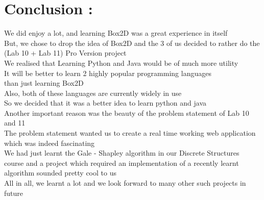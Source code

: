 \documentclass{article}
\begin{document}
\section*{Conclusion : }
\hspace*{5 mm}We did enjoy a lot, and learning Box2D was a great experience in itself \\
\hspace*{5 mm}But, we chose to drop the idea of Box2D and the 3 of us decided to rather do the \\
\hspace*{5 mm}(Lab 10 + Lab 11) Pro Version project \\
\hspace*{5 mm}We realised that Learning Python and Java would be of much more utility \\
\hspace*{5 mm}It will be better to learn 2 highly popular programming languages \\
\hspace*{5 mm}than just learning Box2D \\
\hspace*{5 mm}Also, both of these languages are currently widely in use \\
\hspace*{5 mm}So we decided that it was a better idea to learn python and java \\
\hspace*{5 mm}Another important reason was the beauty of the problem statement of Lab 10 and 11 \\
\hspace*{5 mm}The problem statement wanted us to create a real time working web application \\
\hspace*{5 mm}which was indeed fascinating \\
\hspace*{5 mm}We had just learnt the Gale - Shapley algorithm in our Discrete Structures \\
\hspace*{5 mm}course and a project which required an implementation of a recently learnt \\
\hspace*{5 mm}algorithm sounded pretty cool to us \\
\hspace*{5 mm}All in all, we learnt a lot and we look forward to many other such projects in future \\
\end{document}
